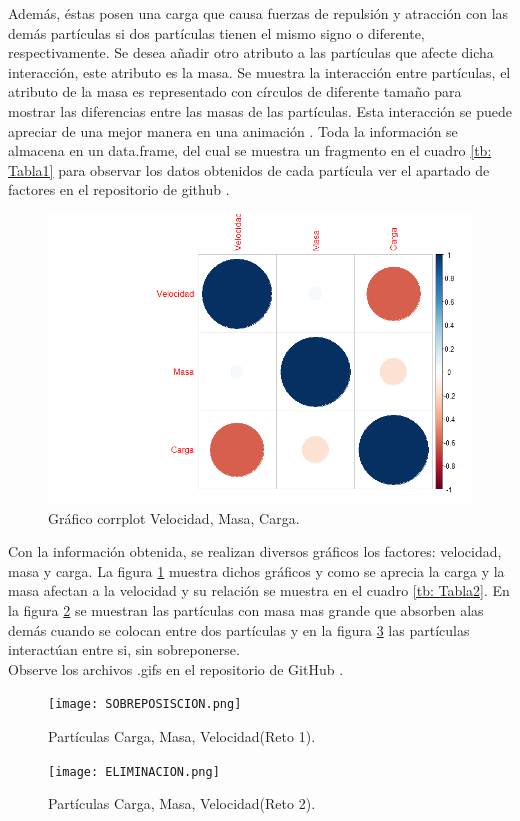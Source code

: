 \documentclass[10pt,a4paper]{article}
\begin{document}
\begin{multicols}{2}
	Además, éstas posen una carga que causa fuerzas de repulsión y atracción con las demás partículas si dos partículas tienen el mismo signo o diferente, respectivamente. Se desea añadir otro atributo a las partículas que afecte dicha interacción, este atributo es la masa. Se muestra la interacción entre partículas, el atributo de la masa es representado con círculos de diferente tamaño para mostrar las diferencias entre las masas de las partículas. Esta interacción se puede apreciar de una mejor manera en una animación \cite{gitadrian}. Toda la información se almacena en un data.frame, del cual se muestra un fragmento en el cuadro \ref{tb: Tabla1} para observar los datos obtenidos de cada partícula ver el apartado de factores en el repositorio de github \cite{gitadrian}.
	
	
			\begin{figure}[H]
				\centering
				\includegraphics[scale=0.4]{Rplot.png}
				\caption{Gráfico corrplot Velocidad, Masa, Carga.}
				\label{fig: Figura1}
			\end{figure}
				Con la información obtenida, se realizan diversos gráficos los factores: velocidad, masa y carga. La figura \ref{fig: Figura1} muestra dichos gráficos y como se aprecia la carga y la masa afectan a la velocidad y su relación se muestra en el cuadro \ref{tb: Tabla2}. En la figura \ref{fig.3} se muestran las partículas con masa mas grande que absorben alas demás cuando se colocan entre dos partículas y en la figura \ref{fig.4} las partículas interactúan entre si, sin sobreponerse. \\

		Observe los archivos .gifs en el repositorio de GitHub \cite{gitadrian}.
					\begin{figure}[H]
				\centering
				\texttt{[image: SOBREPOSISCION.png]}
				\caption{Partículas Carga, Masa, Velocidad(Reto 1).}
				\label{fig.3}
			\end{figure}
				\begin{figure}[H]
				\centering
				\texttt{[image: ELIMINACION.png]}
				\caption{Partículas Carga, Masa, Velocidad(Reto 2).}
				\label{fig.4}
			\end{figure}



\end{multicols}
\end{document}
